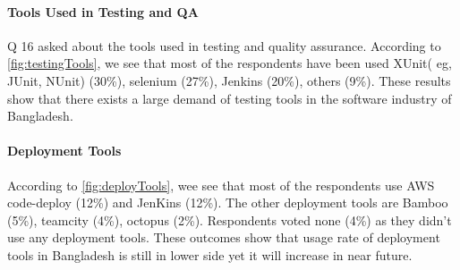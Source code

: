 


\paragraph{Tools Used in Testing and QA}
Q 16 asked about the tools used in testing and quality assurance. According to \ref{fig:testingTools}, we see that most of the respondents have been used XUnit( eg, JUnit, NUnit) (30\%), selenium (27\%), Jenkins (20\%), others (9\%). These results show that there exists a large demand of testing tools in the software industry of Bangladesh.




\paragraph{Deployment Tools}
According to \ref{fig:deployTools}, wee see that most of the respondents use AWS code-deploy (12\%) and JenKins (12\%). The other deployment tools are Bamboo (5\%), teamcity (4\%), octopus (2\%). Respondents voted none (4\%) as they didn’t use any deployment tools. These outcomes show that usage rate of deployment tools in Bangladesh is still in lower side yet it will increase in near future.


